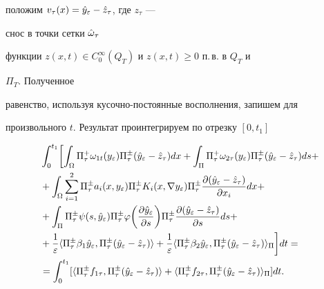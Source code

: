положим $v_\tau(x)=\Hat y_\varepsilon -\Hat z_\tau$, где $z_\tau$ --- 


снос в точки сетки $\Hat \omega_\tau$ 


функции $z(x,t)\in C^\infty_0(Q_T)$ и $z(x,t)\ge 0$ п.\,в. в $Q_T$ и 


$\Pi_T$. Полученное 


равенство, используя кусочно-постоянные восполнения, запишем для 


произвольного $t$. Результат проинтегрируем по отрезку $[0,t_1]$ 


\begin{equation} 


\begin{split} 


& \int^{t_1}_0\biggl [\int_\Omega\Pi^+_\tau \omega_{1 t}(y_\varepsilon) 


\Pi^\pm_\tau(\Hat y _\varepsilon - \Hat z_\tau)dx+ 


\int_\Pi\Pi^+_\tau \omega_{2\tau}(y_\varepsilon)


\Pi^\pm_\tau(\Hat y _\varepsilon - \Hat z_\tau)ds +\\


&+\int_\Omega\sum^2_{i=1}\Pi^\pm_\tau a_i(x,y_\varepsilon) 


\Pi^\pm_\tau K_i(x,\nabla y_\varepsilon)\Pi^\pm_\tau 


\frac{\partial(\Hat y_\varepsilon -\Hat z_\tau)}{\partial x_i} dx +\\ 


&+\int_\Pi\Pi^\pm_\tau \psi(s,\Hat y_\varepsilon) 


\Pi^\pm_\tau \varphi 


\biggl(\frac{\partial \Hat y_\varepsilon}{\partial s}\biggr) 


\Pi^\pm_\tau 


\frac{\partial( \Hat y_\varepsilon -\Hat z_\tau)}{\partial s} ds +\\ 


&+\frac{1}{\varepsilon}\langle \Pi^\pm_\tau \beta_1\Hat y_\varepsilon, 


\Pi^\pm_\tau(\Hat y_\varepsilon -\Hat z_\tau)\rangle + 


\frac{1}{\varepsilon}\langle \Pi^\pm_\tau \beta_2\Hat y_\varepsilon, 


\Pi^\pm_\tau(\Hat y_\varepsilon -\Hat z_\tau)\rangle_\Pi \biggr ] dt =\\


&=\int_0^{t_1}[\langle \Pi^\pm_\tau f_{1\tau}, 


\Pi^\pm_\tau(\Hat y_\varepsilon -\Hat z_\tau)\rangle +


\langle \Pi^\pm_\tau f_{2\tau}, 


\Pi^\pm_\tau(\Hat y_\varepsilon -\Hat z_\tau)\rangle_\Pi ]dt.


\end{split} 


\end{equation} 


